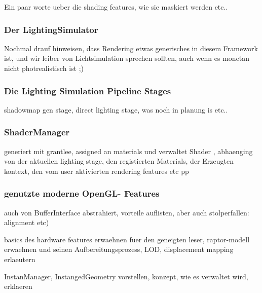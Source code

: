 
\label{sec:visualDomain}
	
Ein paar worte ueber die shading features, wie sie maskiert werden etc..

\subsubsection{Der LightingSimulator}
	Nochmal drauf hinweisen, dass Rendering etwas generisches in diesem Framework ist, und wir leiber von Lichtsimulation sprechen sollten, auch wenn es monetan nicht photrealistisch ist ;)

\subsubsection{Die Lighting Simulation Pipeline Stages}
	shadowmap gen stage, direct lighting stage, was noch in planung is etc..	

\subsubsection{ShaderManager}
	generiert mit grantlee, assigned an materials und verwaltet Shader , abhaenging von der aktuellen lighting stage, den registierten Materials,
	der Erzeugten kontext, den vom user aktivierten rendering features etc pp

\subsubsection{genutzte moderne OpenGL- Features}	

	auch von BufferInterface abstrahiert, vorteile auflisten, aber auch stolperfallen: alignment etc)	

	basics des hardware features erwaehnen fuer den geneigten leser, raptor-modell erwaehnen und seinen 		
	Aufbereitungsprozess, LOD, displacement mapping erlaeutern	
	
	InstanManager, InstangedGeometry vorstellen, konzept, wie es verwaltet wird, erklaeren
	

	
	  

\clearpage
